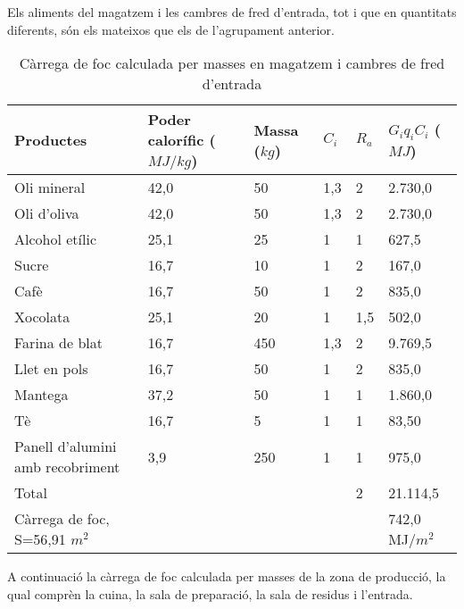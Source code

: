 \noindent Els aliments del magatzem i les cambres de fred d'entrada, tot i que en quantitats diferents, són els mateixos que els de l'agrupament anterior.


\begin{table}[H]
\small
\begin{center}
 \begin{tabu} to \textwidth {|X[1.5, l]|X[r]|X[r]|X[r]|X[r]|X[r]|}%
 \hline
Productes & Poder calorífic ($MJ/kg$)& Massa ($kg$) & $C_i$ & $R_a$ & $G_iq_{i}C_i$ ($MJ$) \\
 \hline \hline 
Oli mineral & 42,0 & 50 & 1,3 & 2 & 2.730,0 \\ \hline
Oli d'oliva & 42,0 & 50 & 1,3 & 2 & 2.730,0 \\ \hline
Alcohol etílic & 25,1 & 25 & 1 & 1 & 627,5 \\ \hline
Sucre & 16,7 & 10 & 1 & 2 & 167,0 \\ \hline
Cafè & 16,7 & 50 & 1 & 2 & 835,0 \\ \hline
Xocolata & 25,1 & 20 & 1 & 1,5 & 502,0 \\ \hline
Farina de blat & 16,7 & 450 & 1,3 & 2 & 9.769,5 \\ \hline
Llet en pols & 16,7 & 50 & 1 & 2 & 835,0 \\ \hline
Mantega & 37,2 & 50 & 1 & 1 & 1.860,0 \\ \hline
Tè & 16,7 & 5 & 1 & 1 & 83,50 \\ \hline
Panell d'alumini amb recobriment & 3,9 & 250 & 1 & 1 & 975,0 \\ \hline \hline
Total & & & & 2 & 21.114,5 \\ \hline
Càrrega de foc, S=56,91 $m^2$ &  & 742,0 MJ/$m^2$ \\ \hline
 \end{tabu}
 \caption{Càrrega de foc calculada per masses en magatzem i cambres de fred d'entrada}
\end{center}
\end{table}

\noindent A continuació la càrrega de foc calculada per masses de la zona de producció, la qual comprèn la cuina, la sala de preparació, la sala de residus i l'entrada.

